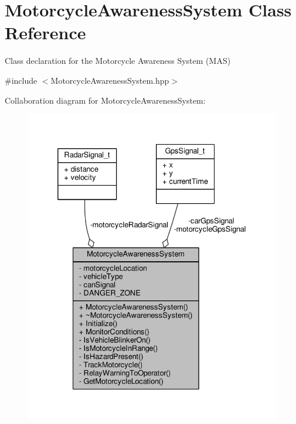 \hypertarget{classMotorcycleAwarenessSystem}{\section{Motorcycle\-Awareness\-System Class Reference}
\label{classMotorcycleAwarenessSystem}
}


Class declaration for the Motorcycle Awareness System (M\-A\-S)  




{\ttfamily \#include $<$Motorcycle\-Awareness\-System.\-hpp$>$}



Collaboration diagram for Motorcycle\-Awareness\-System\-:\nopagebreak
\begin{figure}[H]
\begin{center}
\leavevmode
\includegraphics[width=332pt]{classMotorcycleAwarenessSystem__coll__graph}
\end{center}
\end{figure}

